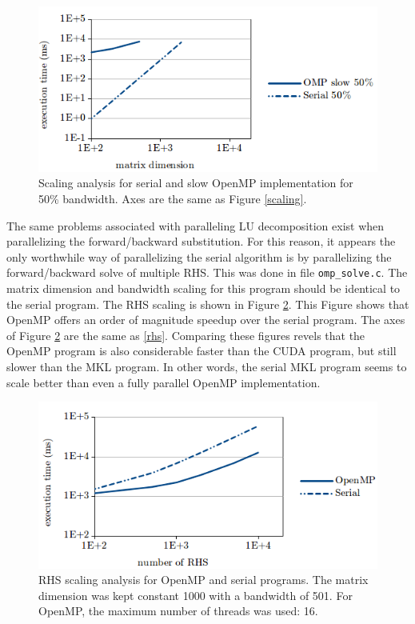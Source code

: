 \documentclass[12pt]{article}
\begin{document}
\begin{figure}[H]
\caption{Scaling analysis for serial and slow OpenMP implementation for 50\% bandwidth. Axes are the same as Figure \ref{scaling}.}
\label{slow}
\centerline{\includegraphics[width=12cm]{slow.png}}
\end{figure}

The same problems associated with paralleling LU decomposition exist when
parallelizing the forward/backward substitution. For this reason, it appears
the only worthwhile way of parallelizing the serial algorithm is by
parallelizing the forward/backward solve of multiple RHS. This was done in file
\texttt{omp\_solve.c}. The matrix dimension and bandwidth scaling for this
program should be identical to the serial program. The RHS scaling is shown in
Figure \ref{omprhs}. This Figure shows that OpenMP offers an order of magnitude
speedup over the serial program. The axes of Figure \ref{omprhs} are the same
as \ref{rhs}. Comparing these figures revels that the OpenMP program is also
considerable faster than the CUDA program, but still slower than the MKL program. In other words, the serial MKL program seems to scale better than even a fully parallel OpenMP implementation.

\begin{figure}[H]
\caption{RHS scaling analysis for OpenMP and serial programs. The matrix dimension was kept constant 1000 with a bandwidth of 501. For OpenMP, the maximum number of threads was used: 16.}
\label{omprhs}
\centerline{\includegraphics[width=12cm]{omp_rhs.png}}
\end{figure}
\end{document}
